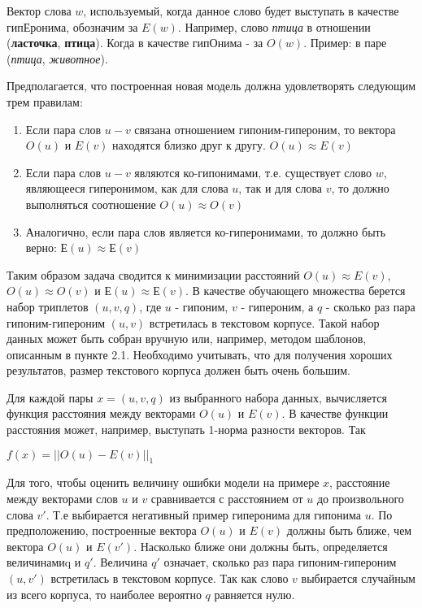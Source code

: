 Вектор слова \textbf{$w$}, используемый, когда данное слово будет выступать в качестве
гипЕронима, обозначим за \textbf{$E(w)$}. Например, слово \textit{птица} в отношении (\textbf{ласточка}, \textbf{птица}). Когда в качестве гипОнима - за \textbf{$O(w)$}. Пример: в паре (\textit{птица}, \textit{животное}).

Предполагается, что построенная новая модель должна удовлетворять следующим
трем правилам:

\begin{enumerate}
\item Если пара слов $u-v$ связана отношением гипоним-гипероним, то вектора $O(u)$ и $E(v)$ находятся близко друг к другу. $O(u) \approx E(v)$
\item Если пара слов $u-v$ являются ко-гипонимами, т.е. существует слово $w$,
являющееся гиперонимом, как для слова $u$, так и для слова $v$, то должно
выполняться соотношение $O(u) \approx O(v)$
\item Аналогично, если пара слов является ко-гиперонимами, то должно быть верно: $Е(u) \approx Е(v)$
\end{enumerate}

Таким образом задача сводится к минимизации расстояний $O(u) \approx E(v)$, $O(u) \approx O(v)$ и $Е(u) \approx Е(v)$.
В качестве обучающего множества берется набор триплетов $(u, v, q)$, где $u$ - гипоним, $v$ - гипероним, а $q$ - сколько раз пара гипоним-гипероним $(u, v)$ встретилась в текстовом корпусе. Такой набор данных может быть собран вручную или,
например, методом шаблонов, описанным в пункте 2.1. Необходимо учитывать, что
для получения хороших результатов, размер текстового корпуса должен быть
очень большим.

Для каждой пары $x = (u, v, q)$ из выбранного набора данных, вычисляется функция
расстояния между векторами $O(u)$ и $E(v)$. В качестве функции расстояния может,
например, выступать 1-норма разности векторов. Так

$f(x) = ||O(u) - E(v)||_1$

Для того, чтобы оценить величину ошибки модели на примере $x$, расстояние между
векторами слов $u$ и $v$ сравнивается с расстоянием от $u$ до произвольного слова $v'$.
Т.е выбирается негативный пример гиперонима для гипонима $u$. По
предположению, построенные вектора $O(u)$ и $E(v)$ должны быть ближе, чем
вектора $O(u)$ и $E(v')$. Насколько ближе они должны быть, определяется величинамиq и $q'$. Величина $q'$ означает, сколько раз пара гипоним-гипероним $(u, v')$
встретилась в текстовом корпусе. Так как слово $v$ выбирается случайным из всего
корпуса, то наиболее вероятно $q$ равняется нулю.
